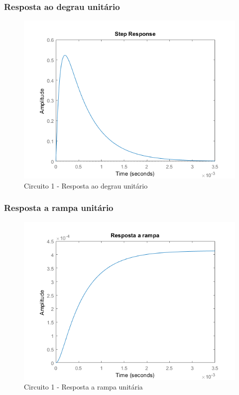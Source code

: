 \documentclass[a4paper, 12pt]{article}
\begin{document}
			\subsubsection{Resposta ao degrau unitário}
			\begin{figure}[!ht]
				\centering
				\includegraphics[scale=0.68]{img/1g_circ1.png}
				\caption{Circuito 1 - Resposta ao degrau unitário}
			\end{figure}
			\subsubsection{Resposta a rampa unitário}
			\begin{figure}[!ht]
				\centering
				\includegraphics[scale=0.68]{img/1h_circ1.png}
				\caption{Circuito 1 - Resposta a rampa unitária}
			\end{figure}
\end{document}
